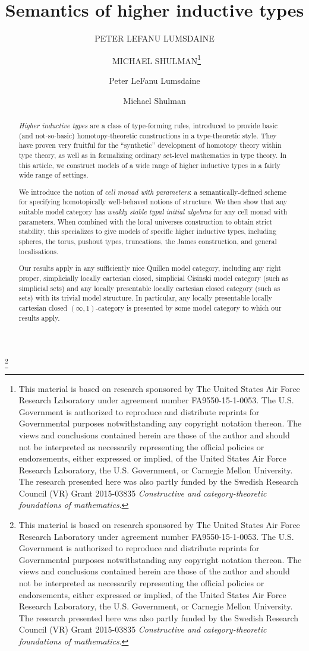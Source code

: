 \title{Semantics of higher inductive types}

\newcommand{\thankstext}{This material is based on research sponsored by The United States Air Force Research Laboratory under agreement number FA9550-15-1-0053.  The U.S. Government is authorized to reproduce and distribute reprints for Governmental purposes notwithstanding any copyright notation thereon.  The views and conclusions contained herein are those of the author and should not be interpreted as necessarily representing the official policies or endorsements, either expressed or implied, of the United States Air Force Research Laboratory, the U.S. Government, or Carnegie Mellon University.
  The research presented here was also partly funded by the Swedish Research Council (VR) Grant 2015-03835 \emph{Constructive and category-theoretic foundations of mathematics}.}
\ifmpcps
  \author[Peter LeFanu Lumsdaine and Michael Shulman]{PETER LEFANU LUMSDAINE \and\ MICHAEL SHULMAN\thanks{\thankstext}}
\else
  \author{Peter LeFanu Lumsdaine}
  \author{Michael Shulman}
  \thanks{\thankstext}
\fi



\maketitle

\ifmpcps
\else
 \vspace{-1.7\baselineskip} %
\fi

\begin{abstract}
  \emph{Higher inductive types} are a class of type-forming rules, introduced to provide basic (and not-so-basic) homotopy-theoretic constructions in a type-theoretic style.
  They have proven very fruitful for the ``synthetic'' development of homotopy theory within type theory, as well as in formalizing ordinary set-level mathematics in type theory.
  In this article, we construct models of a wide range of higher inductive types in a fairly wide range of settings.
  
  We introduce the notion of \emph{cell monad with parameters}: a semantically-defined scheme for specifying homotopically well-behaved notions of structure.
  We then show that any suitable model category has \emph{weakly stable typal initial algebras} for any cell monad with parameters.
  When combined with the local universes construction to obtain strict stability, this specializes to give models of specific higher inductive types, including spheres, the torus, pushout types, truncations, the James construction, and general localisations.

  Our results apply in any sufficiently nice Quillen model category, including any right proper, simplicially locally cartesian closed, simplicial Cisinski model category (such as simplicial sets) and any locally presentable locally cartesian closed category (such as sets) with its trivial model structure.
  In particular, any locally presentable locally cartesian closed $(\infty,1)$-category is presented by some model category to which our results apply.
\end{abstract}

